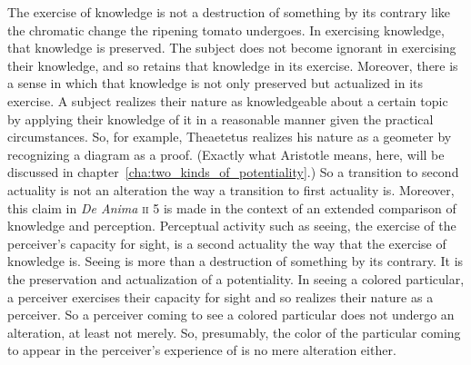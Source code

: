 The exercise of knowledge is not a destruction of something by its contrary like the chromatic change the ripening tomato undergoes. In exercising knowledge, that knowledge is preserved. The subject does not become ignorant in exercising their knowledge, and so retains that knowledge in its exercise. Moreover, there is a sense in which that knowledge is not only preserved but actualized in its exercise. A subject realizes their nature as knowledgeable about a certain topic by applying their knowledge of it in a reasonable manner given the practical circumstances. So, for example, Theaetetus realizes his nature as a geometer by recognizing a diagram as a proof. (Exactly what Aristotle means, here, will be discussed in chapter~\ref{cha:two_kinds_of_potentiality}.) So a transition to second actuality is not an alteration the way a transition to first actuality is. Moreover, this claim in \emph{De Anima} \textsc{ii} 5 is made in the context of an extended comparison of knowledge and perception. Perceptual activity such as seeing, the exercise of the perceiver's capacity for sight, is a second actuality the way that the exercise of knowledge is. Seeing is more than a destruction of something by its contrary. It is the preservation and actualization of a potentiality. In seeing a colored particular, a perceiver exercises their capacity for sight and so realizes their nature as a perceiver. So a perceiver coming to see a colored particular does not undergo an alteration, at least not merely. So, presumably, the color of the particular coming to appear in the perceiver's experience of is no mere alteration either. 

